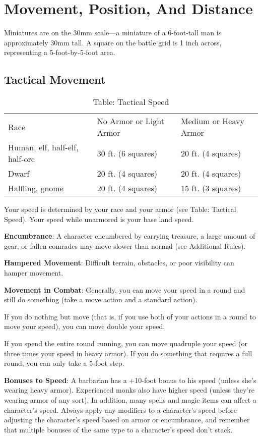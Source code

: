 \section{Movement, Position, And Distance}

				
Miniatures are on the 30mm scale---a miniature of a 6-foot-tall man is approximately 30mm tall. A square on the battle grid is 1 inch across, representing a 5-foot-by-5-foot area.
				
\subsection{Tactical Movement}

\begin{table}[]
\sffamily
\caption{Table: Tactical Speed}
\begin{tabular}{lll}
Race & No Armor or Light Armor & Medium or Heavy Armor\\
Human, elf, half-elf, half-orc & 30 ft. (6 squares) & 20 ft. (4 squares) \\
 Dwarf & 20 ft. (4 squares) & 20 ft. (4 squares) \\
 Halfling, gnome & 20 ft. (4 squares) & 15 ft. (3 squares)\\
\end{tabular}
\end{table}			
Your speed is determined by your race and your armor (see Table: Tactical Speed). Your speed while unarmored is your base land speed.
				
\textbf{Encumbrance}: A character encumbered by carrying treasure, a large amount of gear, or fallen comrades may move slower than normal (see Additional Rules).
				
\textbf{Hampered Movement}: Difficult terrain, obstacles, or poor visibility can hamper movement.
				
\textbf{Movement in Combat}: Generally, you can move your speed in a round and still do something (take a move action and a standard action).
				
If you do nothing but move (that is, if you use both of your actions in a round to move your speed), you can move double your speed.
				
If you spend the entire round running, you can move quadruple your speed (or three times your speed in heavy armor). If you do something that requires a full round, you can only take a 5-foot step.
				
\textbf{Bonuses to Speed}: A barbarian has a +10-foot bonus to his speed (unless she's wearing heavy armor). Experienced monks also have higher speed (unless they're wearing armor of any sort). In addition, many spells and magic items can affect a character's speed. Always apply any modifiers to a character's speed before adjusting the character's speed based on armor or encumbrance, and remember that multiple bonuses of the same type to a character's speed don't stack.
				
